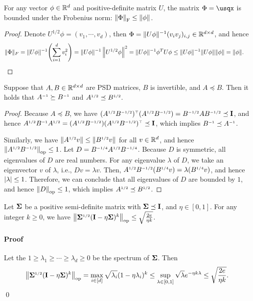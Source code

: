 \begin{lemma}\label{lem:uxxu}
For any vector $\x\in\R^d$ and positive-definite matrix $U$, the matrix $\Phi=\usqx$ is bounded under the Frobenius norm: $\nrmF{\Phi}\leq \nrm{\phi}$.
\end{lemma}

\begin{proof}
Denote $U^{1/2}\phi=(v_1, \cdots, v_d)$, then 
$\Phi=\|U\phi\|^{-1}(v_i v_j)_{i,j}\in\Rdd$, and hence
\[
\begin{aligned}
    \|\Phi\|_F &=\|U\phi\|^{-1}\paren{\sum_{i=1}^d v_i^2} 
    = \|U\phi\|^{-1} \nrm{U^{1/2}\phi}^2 
    = \|U\phi\|^{-1} \phi^{T} U \phi
   \le \|U\phi\|^{-1} \|U\phi\| \|\phi\| =\|\phi\|.
\end{aligned}
\]
\end{proof}

\begin{lemma}\label{lem:matrix-monotone}
Suppose that $A, B\in\Rdd$ are PSD matrices, $B$ is invertible, and $A\preceq B$. Then it holds that $A\iv\succeq B\iv$ and $A\sq \preceq B\sq$.
\end{lemma}
\begin{proof}
Because $A\preceq B$, we have $(A\sq B\isq)\tp (A\sq B\isq)=B\isq A B\isq\preceq \id$, and hence $A\sq B\iv A\sq = (A\sq B\isq)(A\sq B\isq)\tp\preceq \id$, which implies $B\iv\preceq A\iv$.

Similarly, we have $\nrm{A\sq v}\leq \nrm{B\sq v}$ for all $v\in\R^d$, and hence $\nrmop{A\sq B\isq}\leq 1$. Let $D=B\sups{-1/4}A\sq B\sups{-1/4}$. Because $D$ is symmetric, all eigenvalues of $D$ are real numbers. For any eigenvalue $\lambda$ of $D$, we take an eigenvector $v$ of $\lambda$, i.e., $Dv=\lambda v$. Then, $A\sq B\isq (B\sups{1/4}v)=\lambda (B\sups{1/4}v)$, and hence $\abs{\lambda}\leq 1$. Therefore, we can conclude that all eigenvalues of $D$ are bounded by $1$, and hence $\nrmop{D}\leq 1$, which implies $A\sq\preceq B\sq$.
\end{proof}

\begin{lemma}\label{lem:cov-k-converge}
Let $\bSigma$ be a positive semi-definite matrix with $\bSigma\preceq \id$, and $\eta\in[0,1]$. For any integer $k\geq 0$,  we have $\nrmop{\bSigma\sq (\id-\eta\bSigma)^k}\leq \sqrt{\frac{2e}{\eta k}}$.
\end{lemma}

\paragraph{Proof}
Let the $1\geq \lambda_1\geq \cdots\geq \lambda_d\geq 0$ be the spectrum of $\bSigma$. Then 
\begin{align*}
    \nrmop{\bSigma\sq (\id-\eta\bSigma)^k}=\max_{i\in[d]}\sqrt{\lambda_i}(1-\eta\lambda_i)^k
    \leq\sup_{\lambda\in[0,1]} \sqrt{\lambda}e^{-\eta k\lambda}\leq \sqrt{\frac{2e}{\eta k}}.
\end{align*}
\qed
